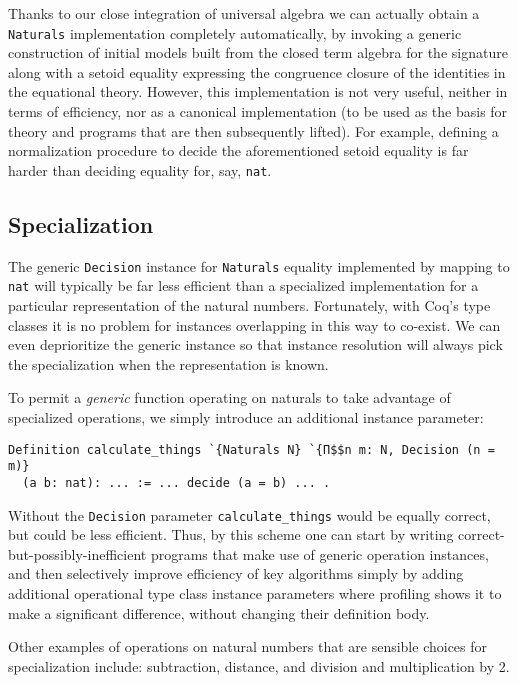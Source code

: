 \documentclass[a4paper,10pt,runningheads]{llncs}
\begin{document}
Thanks to our close integration of universal algebra we can actually obtain a \lstinline|Naturals| implementation completely automatically, by invoking a generic construction of initial models built from the closed term algebra for the signature along with a setoid equality expressing the congruence closure of the identities in the equational theory. However, this implementation is not very useful, neither in terms of efficiency, nor as a canonical implementation (to be used as the basis for theory and programs that are then subsequently lifted). For example, defining a normalization procedure to decide the aforementioned setoid equality is far harder than deciding equality for, say, \lstinline|nat|.

\subsection{Specialization}

The generic \lstinline|Decision| instance for \lstinline|Naturals| equality implemented by mapping to \lstinline|nat| will typically be far less efficient than a specialized implementation for a particular representation of the natural numbers. Fortunately, with Coq's type classes it is no problem for instances overlapping in this way to co-exist. We can even deprioritize the generic instance so that instance resolution will always pick the specialization when the representation is known.

To permit a \emph{generic} function operating on naturals to take advantage of specialized operations, we simply introduce an additional instance parameter:
\begin{lstlisting}
Definition calculate_things `{Naturals N} `{Π$$n m: N, Decision (n = m)}
  (a b: nat): ... := ... decide (a = b) ... .
\end{lstlisting}
Without the \lstinline|Decision| parameter \lstinline|calculate_things| would be equally correct, but could be less efficient. Thus, by this scheme one can start by writing correct-but-possibly-inefficient programs that make use of generic operation instances, and then selectively improve efficiency of key algorithms simply by adding additional operational type class instance parameters where profiling shows it to make a significant difference, without changing their definition body.

Other examples of operations on natural numbers that are sensible choices for specialization include: subtraction, distance, and division and multiplication by 2.
\end{document}
